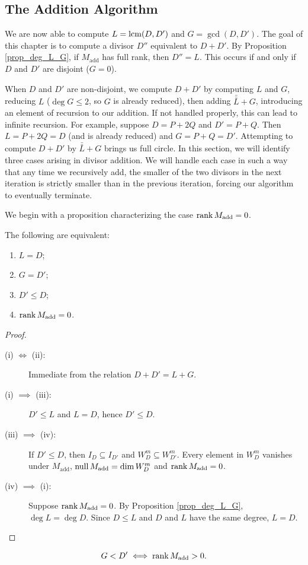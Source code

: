 \subsection{The Addition Algorithm}

We are now able to compute $L = \operatorname{lcm}(D, D')$ and $G = \gcd(D, D')$.
The goal of this chapter is to compute a divisor $D''$ equivalent to $D + D'$.
By Proposition \ref{prop_deg_L_G}, if $M_{\text{add}}$ has full rank, then $D'' = L$.
This occurs if and only if $D$ and $D'$ are disjoint ($G = 0$).

When $D$ and $D'$ are non-disjoint,
we compute $D + D'$ by computing $L$ and $G$, reducing $L$ ($\deg G \leq 2$, so $G$ is already reduced),
then adding $\bar{\bar L} + G$, introducing an element of recursion to our addition.
If not handled properly, this can lead to infinite recursion.
For example, suppose $D = P + 2Q$ and $D' = P + Q$.
Then $L = P + 2Q = D$ (and is already reduced) and $G = P + Q = D'$.
Attempting to compute $D + D'$ by $\bar{\bar L} + G$ brings us full circle.
In this section, we will identify three cases arising in divisor addition.
We will handle each case in such a way that any time we recursively add,
the smaller of the two divisors in the next iteration
is strictly smaller than in the previous iteration,
forcing our algorithm to eventually terminate.

We begin with a proposition characterizing the case $\operatorname{rank} M_{\text{add}} = 0$.
\begin{proposition}
  \label{prop_rank_M}
  The following are equivalent:
  \begin{enumerate}[label=(\roman*)]
    \item $L = D$;
    \item $G = D'$;
    \item $D' \leq D$;
    \item $\operatorname{rank} M_{\text{add}} = 0$.
  \end{enumerate}
\end{proposition}
\begin{proof}
  \begin{description}
    \item[(i) $\iff$ (ii):]
      Immediate from the relation $D + D' = L + G$.
    \item[(i) $\implies$ (iii):]
      $D' \leq L$ and $L = D$, hence $D' \leq D$.
    \item[(iii) $\implies$ (iv):]
      If $D' \leq D$, then $I_D \subseteq I_{D'}$ and $W_D^m \subseteq W_{D'}^m$.
      Every element in $W_D^m$ vanishes under $M_{\text{add}}$,
      $\operatorname{null} M_{\text{add}} = \dim W_D^m$ and $\operatorname{rank} M_{\text{add}} = 0$.
    \item[(iv) $\implies$ (i):]
      Suppose $\operatorname{rank} M_{\text{add}} = 0$.
      By Proposition \ref{prop_deg_L_G}, $\deg L = \deg D$.
      Since $D \leq L$ and $D$ and $L$ have the same degree, $L = D$.
  \end{description}
\end{proof}
\begin{corollary}
  \[ G < D' \iff \operatorname{rank} M_{\text{add}} > 0. \]
\end{corollary}

